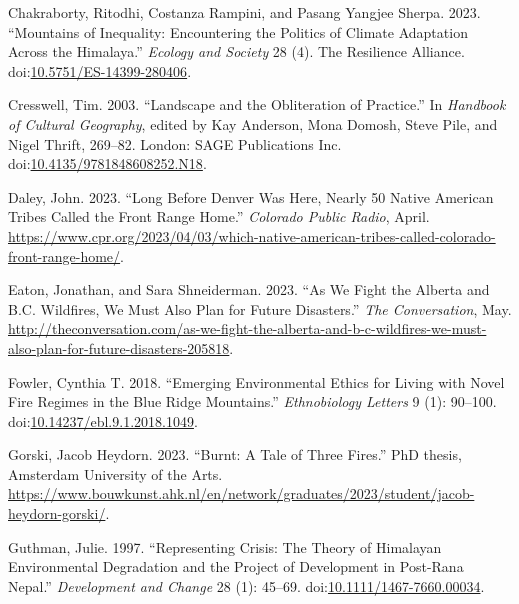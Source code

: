 \documentclass[
]{article}
\newlength{\cslhangindent}
\newenvironment{CSLReferences}[2] %
 {\begin{list}{}{%
  \setlength{\itemindent}{0pt}
  \setlength{\leftmargin}{0pt}
  \setlength{\parsep}{0pt}
  \ifodd #1
   \setlength{\leftmargin}{\cslhangindent}
   \setlength{\itemindent}{-1\cslhangindent}
  \fi
  \setlength{\itemsep}{#2\baselineskip}}}
 {\end{list}}
\begin{document}
\begin{CSLReferences}{1}{0}
Chakraborty, Ritodhi, Costanza Rampini, and Pasang Yangjee Sherpa. 2023. {``Mountains of Inequality: Encountering the Politics of Climate Adaptation Across the {Himalaya}.''} \emph{Ecology and Society} 28 (4). The Resilience Alliance. doi:\href{https://doi.org/10.5751/ES-14399-280406}{10.5751/ES-14399-280406}.

Cresswell, Tim. 2003. {``Landscape and the Obliteration of Practice.''} In \emph{Handbook of {Cultural Geography}}, edited by Kay Anderson, Mona Domosh, Steve Pile, and Nigel Thrift, 269--82. London: SAGE Publications Inc. doi:\href{https://doi.org/10.4135/9781848608252.N18}{10.4135/9781848608252.N18}.

Daley, John. 2023. {``Long Before {Denver} Was Here, Nearly 50 {Native American} Tribes Called the {Front Range} Home.''} \emph{Colorado Public Radio}, April. \url{https://www.cpr.org/2023/04/03/which-native-american-tribes-called-colorado-front-range-home/}.

Eaton, Jonathan, and Sara Shneiderman. 2023. {``As We Fight the {Alberta} and {B}.{C}. Wildfires, We Must Also Plan for Future Disasters.''} \emph{The Conversation}, May. \url{http://theconversation.com/as-we-fight-the-alberta-and-b-c-wildfires-we-must-also-plan-for-future-disasters-205818}.

Fowler, Cynthia T. 2018. {``Emerging {Environmental Ethics} for {Living} with {Novel Fire Regimes} in the {Blue Ridge Mountains}.''} \emph{Ethnobiology Letters} 9 (1): 90--100. doi:\href{https://doi.org/10.14237/ebl.9.1.2018.1049}{10.14237/ebl.9.1.2018.1049}.

Gorski, Jacob Heydorn. 2023. {``Burnt: {A Tale} of {Three Fires}.''} PhD thesis, Amsterdam University of the Arts. \url{https://www.bouwkunst.ahk.nl/en/network/graduates/2023/student/jacob-heydorn-gorski/}.

Guthman, Julie. 1997. {``Representing {Crisis}: {The Theory} of {Himalayan Environmental Degradation} and the {Project} of {Development} in {Post-Rana Nepal}.''} \emph{Development and Change} 28 (1): 45--69. doi:\href{https://doi.org/10.1111/1467-7660.00034}{10.1111/1467-7660.00034}.


\end{CSLReferences}
\end{document}
